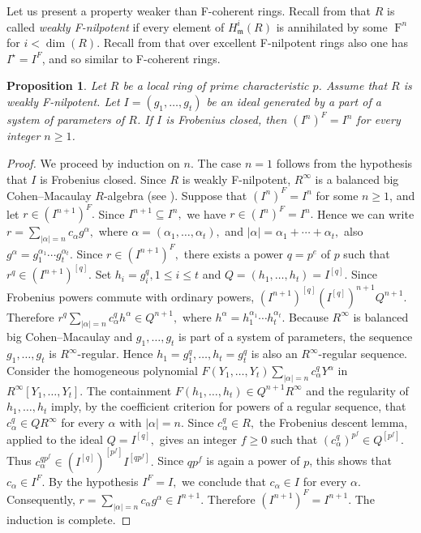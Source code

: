 \documentclass[11pt,a4paper]{amsart}
\numberwithin{equation}{section}
\newtheorem{proposition}[theorem]{Proposition}
\theoremstyle{definition}
\theoremstyle{remark}
\newcommand{\F}{\operatorname{F}}
\newcommand{\fm}{\mathfrak{m}}
\begin{document}
Let us present a property weaker than F-coherent rings. Recall from \cite{MP} that $R$ is called \emph{weakly F-nilpotent}  if  every element of $H^i_\fm(R)$ is annihilated by some   $\F^n$ for
$i < \dim(R)$.
 Recall from \cite[Exercise 68]{MP}  that over excellent F-nilpotent rings also one has
$I^\star=I^F$, and so similar to F-coherent rings.
\begin{proposition}\label{5.4}
	Let $R$ be a  local ring of prime characteristic $p$.
	Assume that $R$ is weakly F-nilpotent. Let
	$
	I=(g_1,\ldots,g_t)
	$
	be an ideal generated by a part of a system of parameters of $R$. If $I$ is
	Frobenius closed, then
	$
	(I^n)^F=I^n
	$
	for every integer $n\geq 1$.
\end{proposition}
\begin{proof}
	We proceed by induction on $n$. The case $n=1$ follows from the hypothesis
	that $I$ is Frobenius closed.
	Since $R$ is weakly F-nilpotent,   $R^\infty$ is a
	balanced big Cohen--Macaulay $R$-algebra (see \cite[Proposition 12.22]{MP}). 
	Suppose that
	$
	(I^n)^F=I^n
	$
	for some $n\geq 1$, and let
	$
	r\in (I^{n+1})^F.
	$
	Since
	$
	I^{n+1}\subseteq I^n,
	$
	we have
	$
	r\in (I^n)^F=I^n.
	$
	Hence we can write
	$
	r=\sum_{|\alpha|=n}c_\alpha g^\alpha,
	$
	where
	$
	\alpha=(\alpha_1,\ldots,\alpha_t),
	$ and
	$|\alpha|=\alpha_1+\cdots+\alpha_t,
	$
	also
	$
	g^\alpha=g_1^{\alpha_1}\cdots g_t^{\alpha_t}.
	$
	Since
	$
	r\in (I^{n+1})^F,
	$
	there exists a power
	$
	q=p^e
	$
	of $p$ such that
	$
	r^q\in (I^{n+1})^{[q]}.
	$
	Set
	$
	h_i=g_i^q,1\leq i\leq t
	$
	and
	$
	Q=(h_1,\ldots,h_t)=I^{[q]}.
	$
	Since Frobenius powers commute with ordinary powers,
	$
	(I^{n+1})^{[q]}
	(I^{[q]})^{n+1}
	Q^{n+1}.
	$
	Therefore
	$
	r^q
	\sum_{|\alpha|=n}c_\alpha^q h^\alpha
	\in Q^{n+1},
	$
	where
	$
	h^\alpha=h_1^{\alpha_1}\cdots h_t^{\alpha_t}.
	$
	Because $R^\infty$ is balanced big Cohen--Macaulay and
	$g_1,\ldots,g_t$ is part of a system of parameters, the sequence
	$
	g_1,\ldots,g_t
	$
	is $R^\infty$-regular. Hence
	$
	h_1=g_1^q,\ldots,h_t=g_t^q
	$
	is also an $R^\infty$-regular sequence.
	Consider the homogeneous polynomial
	$
	F(Y_1,\ldots,Y_t)
	\sum_{|\alpha|=n}c_\alpha^qY^\alpha
	$
	in
	$
	R^\infty[Y_1,\ldots,Y_t].
	$
	The containment
	$
	F(h_1,\ldots,h_t)\in Q^{n+1}R^\infty
	$
	and the regularity of
	$
	h_1,\ldots,h_t
	$
	imply, by the coefficient criterion for powers of a regular sequence, that
	$
	c_\alpha^q\in QR^\infty
	$
	for every $\alpha$ with
	$
	|\alpha|=n.
	$
	Since
	$
	c_\alpha^q\in R,
	$
	the Frobenius descent lemma, applied to the ideal
	$
	Q=I^{[q]},
	$
	gives an integer $f\geq0$ such that
	$
	(c_\alpha^q)^{p^f}\in Q^{[p^f]}.
	$
	Thus
	$
	c_\alpha^{qp^f}
	\in
	(I^{[q]})^{[p^f]}
	I^{[qp^f]}.
	$
	Since
	$
	qp^f
	$
	is again a power of $p$, this shows that
	$
	c_\alpha\in I^F.
	$
	By the hypothesis
	$
	I^F=I,
	$
	we conclude that
	$
	c_\alpha\in I
	$
	for every $\alpha$. Consequently,
	$
	r
	=
	\sum_{|\alpha|=n}c_\alpha g^\alpha
	\in I^{n+1}.
	$
	Therefore
	$
	(I^{n+1})^F=I^{n+1}.
	$
	The induction is complete.
\end{proof}
\end{document}
